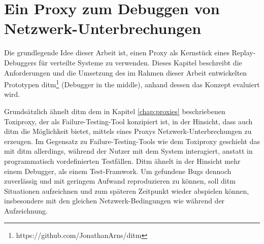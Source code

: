 \documentclass[12pt,a4paper]{report}
\begin{document}
\chapter{Ein Proxy zum Debuggen von Netzwerk-Unterbrechungen}
\label{chap:system}
% 
Die grundlegende Idee dieser Arbeit ist, einen Proxy als Kernstück eines Replay-Debuggers für verteilte Systeme zu verwenden.
Dieses Kapitel beschreibt die Anforderungen und die Umsetzung des im Rahmen dieser Arbeit entwickelten Prototypen
ditm\footnote{https://github.com/JonathanArns/ditm} (Debugger in the middle), anhand dessen das Konzept evaluiert wird.

Grundsätzlich ähnelt ditm dem in Kapitel \ref{chap:proxies} beschriebenen Toxiproxy, der als Failure-Testing-Tool konzipiert ist,
in der Hinsicht, dass auch ditm die Möglichkeit bietet, mittels eines Proxys Netzwerk-Unterbrechungen zu erzeugen. Im Gegensatz
zu Failure-Testing-Tools wie dem Toxiproxy geschieht das mit ditm allerdings, während der Nutzer mit dem System interagiert,
anstatt in programmatisch vordefinierten Testfällen. Ditm ähnelt in der Hinsicht mehr einem Debugger, als einem Test-Framwork. Um
gefundene Bugs dennoch zuverlässig und mit geringem Aufwand reproduzieren zu können, soll ditm Situationen aufzeichnen und zum
späteren Zeitpunkt wieder abspielen können, insbesondere mit den gleichen Netzwerk-Bedingungen wie während der Aufzeichnung.

\end{document}
